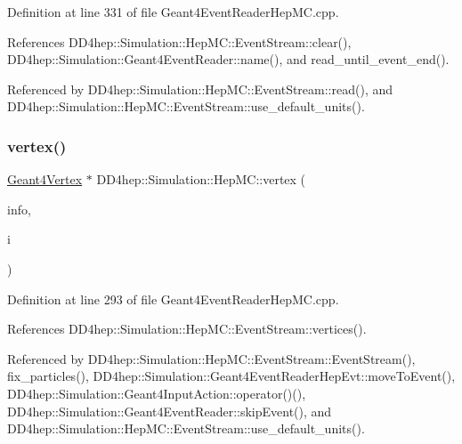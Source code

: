 Definition at line 331 of file Geant4\+Event\+Reader\+Hep\+M\+C.\+cpp.



References D\+D4hep\+::\+Simulation\+::\+Hep\+M\+C\+::\+Event\+Stream\+::clear(), D\+D4hep\+::\+Simulation\+::\+Geant4\+Event\+Reader\+::name(), and read\+\_\+until\+\_\+event\+\_\+end().



Referenced by D\+D4hep\+::\+Simulation\+::\+Hep\+M\+C\+::\+Event\+Stream\+::read(), and D\+D4hep\+::\+Simulation\+::\+Hep\+M\+C\+::\+Event\+Stream\+::use\+\_\+default\+\_\+units().

\hypertarget{namespace_d_d4hep_1_1_simulation_1_1_hep_m_c_a3a13a13dbe2dce0cfbea9607895abf14}{}\label{namespace_d_d4hep_1_1_simulation_1_1_hep_m_c_a3a13a13dbe2dce0cfbea9607895abf14} 
\subsubsection{\texorpdfstring{vertex()}{vertex()}}
{\footnotesize\ttfamily \hyperlink{class_d_d4hep_1_1_simulation_1_1_geant4_vertex}{Geant4\+Vertex} $\ast$ D\+D4hep\+::\+Simulation\+::\+Hep\+M\+C\+::vertex (\begin{DoxyParamCaption}\item[{\hyperlink{class_d_d4hep_1_1_simulation_1_1_hep_m_c_1_1_event_stream}{Event\+Stream} \&}]{info,  }\item[{int}]{i }\end{DoxyParamCaption})}



Definition at line 293 of file Geant4\+Event\+Reader\+Hep\+M\+C.\+cpp.



References D\+D4hep\+::\+Simulation\+::\+Hep\+M\+C\+::\+Event\+Stream\+::vertices().



Referenced by D\+D4hep\+::\+Simulation\+::\+Hep\+M\+C\+::\+Event\+Stream\+::\+Event\+Stream(), fix\+\_\+particles(), D\+D4hep\+::\+Simulation\+::\+Geant4\+Event\+Reader\+Hep\+Evt\+::move\+To\+Event(), D\+D4hep\+::\+Simulation\+::\+Geant4\+Input\+Action\+::operator()(), D\+D4hep\+::\+Simulation\+::\+Geant4\+Event\+Reader\+::skip\+Event(), and D\+D4hep\+::\+Simulation\+::\+Hep\+M\+C\+::\+Event\+Stream\+::use\+\_\+default\+\_\+units().

